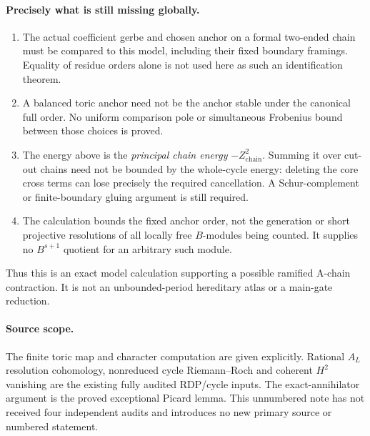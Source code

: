 \paragraph{Precisely what is still missing globally.}
\begin{enumerate}
\item The actual coefficient gerbe and chosen anchor on a formal
      two-ended chain must be compared to this model, including
      their fixed boundary framings. Equality of residue orders
      alone is not used here as such an identification theorem.
\item A balanced toric anchor need not be the anchor stable under
      the canonical full order. No uniform comparison pole or
      simultaneous Frobenius bound between those choices is proved.
\item The energy above is the \emph{principal chain energy}
      $-Z_{\mathrm{chain}}^2$. Summing it over cut-out chains need
      not be bounded by the whole-cycle energy: deleting the core
      cross terms can lose precisely the required cancellation.
      A Schur-complement or finite-boundary gluing argument is
      still required.
\item The calculation bounds the fixed anchor order, not the
      generation or short projective resolutions of all locally
      free $B$-modules being counted. It supplies no $B^{s+1}$
      quotient for an arbitrary such module.
\end{enumerate}
Thus this is an exact model calculation supporting a possible
ramified A-chain contraction. It is not an unbounded-period
hereditary atlas or a main-gate reduction.

\paragraph{Source scope.}
The finite toric map and character computation are given explicitly.
Rational $A_L$ resolution cohomology, nonreduced cycle
Riemann--Roch and coherent $H^2$ vanishing are the existing fully
audited RDP/cycle inputs. The exact-annihilator argument is the
proved exceptional Picard lemma. This unnumbered note has not
received four independent audits and introduces no new primary
source or numbered statement.
